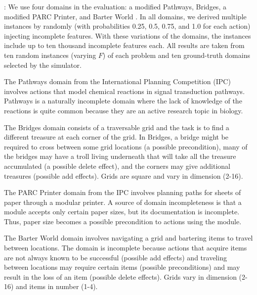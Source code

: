 \documentclass[letterpaper]{article}
\def\und#1{\noindent{\bf #1}:}
\def\citep#1{\cite{#1}}
\begin{document}
\und{Domains} We use four domains in the evaluation: a modified Pathways,
Bridges,  a modified PARC Printer, and Barter World \citep{bryce-icaps11}.  In
all domains, we derived multiple instances by randomly (with probabilities 0.25,
0.5, 0.75, and 1.0 for each action) injecting incomplete  features.   
With these variations of the domains, the instances include up to ten thousand
incomplete  features each. All results are taken from ten random instances
(varying $F$) of each problem and ten ground-truth domains selected by the
simulator.

The Pathways  domain from the International Planning Competition  (IPC) involves actions that model chemical reactions in signal
transduction pathways.  Pathways is a naturally incomplete domain where the lack
of knowledge of the reactions is quite common because they are an active
research topic in biology.  

The Bridges  domain consists of a traversable grid and the task is to find a
different treasure at each corner of the grid. In Bridges,
a bridge might be required  to cross between some grid locations (a possible
precondition), many of the bridges may have a troll living
underneath that will take all the treasure accumulated (a possible delete
effect), and the corners may give additional treasures (possible add
effects).  Grids are square and vary in dimension (2-16).

The PARC Printer  domain from the IPC involves planning paths for sheets of
paper through a modular printer.  A source of domain incompleteness is that a module
accepts only certain paper sizes, but its documentation is incomplete.  Thus,
paper size becomes a possible precondition to actions using the module.

The Barter World  domain involves navigating a grid and bartering items to
travel between locations.  The domain is incomplete because actions that acquire
 items are not always known to be successful (possible add effects) and traveling between locations may require
certain items (possible preconditions) and may result in the loss of an item
(possible delete effects). Grids vary in dimension (2-16) and items
in number (1-4).
\end{document}
